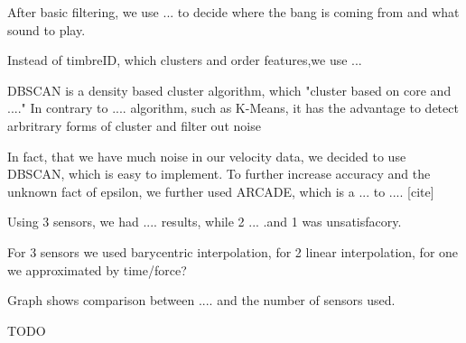 After basic filtering, we use ... to decide where the bang is coming from and what sound to play.

Instead of timbreID, which clusters and order features,we use ... \cite{timbreID}

DBSCAN is a density based cluster algorithm, which "cluster based on core and ...."
In contrary to .... algorithm, such as K-Means, it has the advantage to detect arbritrary forms of cluster and filter out noise\cite{Elbatta2013ADM}

In fact, that we have much noise in our velocity data, we decided to use DBSCAN, which is easy to implement. 
To further increase accuracy and the unknown fact of epsilon, we further used ARCADE, which is a ... to .... [cite]

Using 3 sensors, we had .... results, while 2 ... .and 1 was unsatisfacory.

For 3 sensors we used barycentric interpolation, for 2 linear interpolation, for one we approximated by time/force? 


Graph shows comparison between .... and the number of sensors used.

TODO